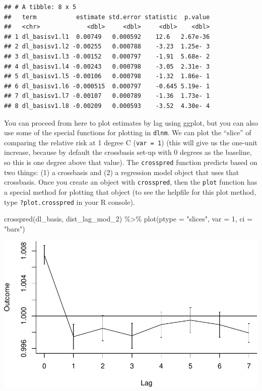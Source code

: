 \documentclass[
]{book}
\newenvironment{Shaded}{\begin{snugshade}}{\end{snugshade}}
\newcommand{\AttributeTok}[1]{\textcolor[rgb]{0.77,0.63,0.00}{#1}}
\newcommand{\DecValTok}[1]{\textcolor[rgb]{0.00,0.00,0.81}{#1}}
\newcommand{\FunctionTok}[1]{\textcolor[rgb]{0.00,0.00,0.00}{#1}}
\newcommand{\NormalTok}[1]{#1}
\newcommand{\SpecialCharTok}[1]{\textcolor[rgb]{0.00,0.00,0.00}{#1}}
\newcommand{\StringTok}[1]{\textcolor[rgb]{0.31,0.60,0.02}{#1}}
\begin{document}
\begin{verbatim}
## # A tibble: 8 x 5
##   term           estimate std.error statistic  p.value
##   <chr>             <dbl>     <dbl>     <dbl>    <dbl>
## 1 dl_basisv1.l1  0.00749   0.000592    12.6   2.67e-36
## 2 dl_basisv1.l2 -0.00255   0.000788    -3.23  1.25e- 3
## 3 dl_basisv1.l3 -0.00152   0.000797    -1.91  5.68e- 2
## 4 dl_basisv1.l4 -0.00243   0.000798    -3.05  2.31e- 3
## 5 dl_basisv1.l5 -0.00106   0.000798    -1.32  1.86e- 1
## 6 dl_basisv1.l6 -0.000515  0.000797    -0.645 5.19e- 1
## 7 dl_basisv1.l7 -0.00107   0.000789    -1.36  1.73e- 1
## 8 dl_basisv1.l8 -0.00209   0.000593    -3.52  4.30e- 4
\end{verbatim}

You can proceed from here to plot estimates by lag using ggplot, but you can also use
some of the special functions for plotting in \texttt{dlnm}. We can plot the ``slice'' of comparing
the relative risk at 1 degree C (\texttt{var\ =\ 1}) (this will give us the one-unit increase,
because by default the crossbasis set-up with 0 degrees as the baseline, so this is
one degree above that value). The \texttt{crosspred} function predicts based on two things: (1)
a crossbasis and (2) a regression model object that uses that crossbasis. Once you create
an object with \texttt{crosspred}, then the \texttt{plot} function has a
special method for plotting that object (to see the helpfile for this
plot method, type \texttt{?plot.crosspred} in your R console).

\begin{Shaded}
\begin{Highlighting}[]
\FunctionTok{crosspred}\NormalTok{(dl\_basis, dist\_lag\_mod\_2) }\SpecialCharTok{\%\textgreater{}\%} 
  \FunctionTok{plot}\NormalTok{(}\AttributeTok{ptype =} \StringTok{"slices"}\NormalTok{, }\AttributeTok{var =} \DecValTok{1}\NormalTok{, }\AttributeTok{ci =} \StringTok{"bars"}\NormalTok{)}
\end{Highlighting}
\end{Shaded}

\includegraphics{adv_epi_analysis_files/figure-latex/unnamed-chunk-95-1.pdf}
\end{document}
